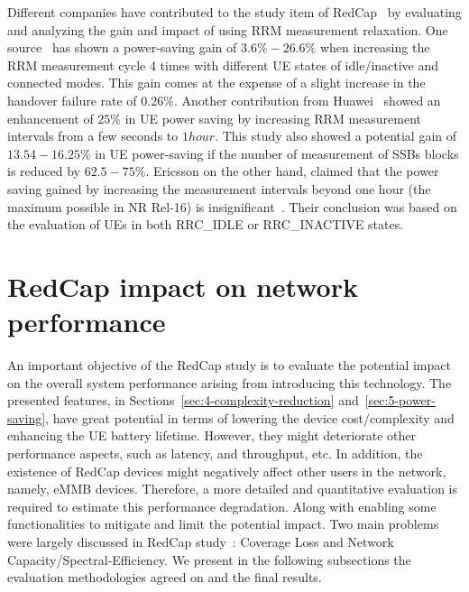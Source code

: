 \documentclass[]{IEEEtran}
\begin{document}
Different companies have contributed to the study item of RedCap~\cite{3gpp_study_2021_38.875} by evaluating and analyzing the gain and impact of using RRM measurement relaxation. One source~\cite{3gpp_tp_2021_R2-2100459} has shown a power-saving gain of $3.6\% - 26.6\%$ when increasing the RRM measurement cycle 4 times with different UE states of idle/inactive and connected modes. This gain comes at the expense of a slight increase in the handover failure rate of $0.26\%$.
Another contribution from Huawei~\cite{3gpp_further_2020_R2-2009116} showed an enhancement of $25\%$ in UE power saving by increasing RRM measurement intervals from a few seconds to $1 hour$. This study also showed a potential gain of $13.54-16.25\%$ in UE power-saving if the number of measurement of SSBs blocks is reduced by $62.5-75\%$.
Ericsson on the other hand, claimed that the power saving gained by increasing the measurement intervals beyond one hour (the maximum possible in NR Rel-16) is insignificant~\cite{3gpp_redcap_2020_R2-2009620}. Their conclusion was based on the evaluation of UEs in both RRC\_IDLE or RRC\_INACTIVE states.

%   

\section{RedCap impact on network performance}
\label{sec:6-redcap-impact}


An important objective of the RedCap study is to evaluate the potential impact on the overall system performance arising from introducing this technology.
The presented features, in Sections~\ref{sec:4-complexity-reduction} and~\ref{sec:5-power-saving}, have great potential in terms of lowering the device cost/complexity and enhancing the UE battery lifetime. 
However, they might deteriorate other performance aspects, such as latency, and throughput, etc.  
In addition, the existence of RedCap devices might negatively affect other users in the network, namely, eMMB devices.
Therefore, a more detailed and quantitative evaluation is required to estimate this performance degradation.
Along with enabling some functionalities to mitigate and limit the potential impact.
Two main problems were largely discussed in RedCap study~\cite{3gpp_study_2021_38.875}: Coverage Loss and Network Capacity/Spectral-Efficiency.
We present in the following subsections the evaluation methodologies agreed on and the final results.
\end{document}

